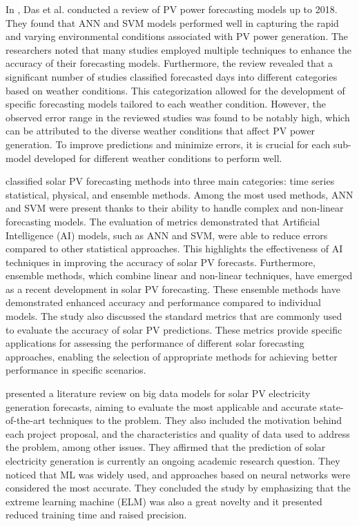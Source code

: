 In \cite{DAS2018912}, Das et al. conducted a review of PV power forecasting models up to 2018.
They found that ANN and SVM models performed well in capturing the rapid and varying environmental conditions associated with PV power generation.
The researchers noted that many studies employed multiple techniques to enhance the accuracy of their forecasting models.
Furthermore, the review revealed that a significant number of studies classified forecasted days into different categories based on weather conditions.
This categorization allowed for the development of specific forecasting models tailored to each weather condition.
However, the observed error range in the reviewed studies was found to be notably high, which can be attributed to the diverse weather conditions that affect PV power generation.
To improve predictions and minimize errors, it is crucial for each sub-model developed for different weather conditions to perform well.

\cite{SOBRI2018459} classified solar PV forecasting methods into three main categories: time series statistical, physical, and ensemble methods.
Among the most used methods, ANN and SVM were present thanks to their ability to handle complex and non-linear forecasting models.
The evaluation of metrics demonstrated that Artificial Intelligence (AI) models, such as ANN and SVM, were able to reduce errors compared to other statistical approaches.
This highlights the effectiveness of AI techniques in improving the accuracy of solar PV forecasts.
Furthermore, ensemble methods, which combine linear and non-linear techniques, have emerged as a recent development in solar PV forecasting.
These ensemble methods have demonstrated enhanced accuracy and performance compared to individual models.
The study also discussed the standard metrics that are commonly used to evaluate the accuracy of solar PV predictions.
These metrics provide specific applications for assessing the performance of different solar forecasting approaches, enabling the selection of appropriate methods for achieving better performance in specific scenarios.

\cite{DEFREITASVISCONDI201954} presented a literature review on big data models for solar PV electricity generation forecasts, aiming to evaluate the most applicable and accurate state-of-the-art techniques to the problem.
They also included the motivation behind each project proposal, and the characteristics and quality of data used to address the problem, among other issues.
They affirmed that the prediction of solar electricity generation is currently an ongoing academic research question.
They noticed that ML was widely used, and approaches based on neural networks were considered the most accurate.
They concluded the study by emphasizing that the extreme learning machine (ELM) was also a great novelty and it presented reduced training time and raised precision.

